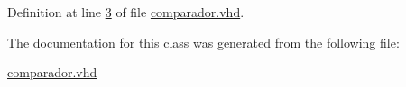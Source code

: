 \subsubsection[{S\+T\+D\+\_\+\+L\+O\+G\+I\+C\+\_\+\+U\+N\+S\+I\+G\+N\+E\+D}]{\hspace{0.3cm}{\ttfamily [Package]}}\label{classcomparador_a241c3e72dd8024cc8ae831b1b2aed7db}


Definition at line \hyperlink{comparador_8vhd_source_l00003}{3} of file \hyperlink{comparador_8vhd_source}{comparador.\+vhd}.



The documentation for this class was generated from the following file\+:\begin{DoxyCompactItemize}
\item 
\hyperlink{comparador_8vhd}{comparador.\+vhd}\end{DoxyCompactItemize}
